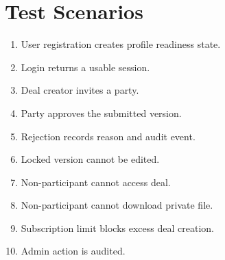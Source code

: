 \chapter{Test Scenarios}
\begin{enumerate}
  \item User registration creates profile readiness state.
  \item Login returns a usable session.
  \item Deal creator invites a party.
  \item Party approves the submitted version.
  \item Rejection records reason and audit event.
  \item Locked version cannot be edited.
  \item Non-participant cannot access deal.
  \item Non-participant cannot download private file.
  \item Subscription limit blocks excess deal creation.
  \item Admin action is audited.
\end{enumerate}
